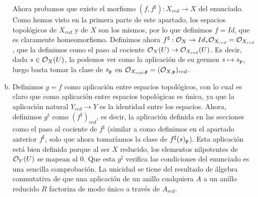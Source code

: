 \documentclass[twoside]{article}
\begin{document}
\begin{solucion}
\begin{enumerate}[(a)]
Ahora probamos que existe el morfismo $(f,f^{\sharp}):X_{red}\to X$ del enunciado. Como hemos visto en la primera parte de este apartado, los espacios topológicos de $X_{red}$ y de $X$ son los mismos, por lo que definimos $f=Id$, que es claramente homeomorfismo. Definimos ahora $f^{\sharp}:{\mathcal O}_{X}\to Id_*{\mathcal O}_{X_{red}}={\mathcal O}_{X_{red}}$, que la definimos como el paso al cociente ${\mathcal O}_{X}(U)\to{\mathcal O}_{X_{red}}(U)$. Es decir, dada $s\in {\mathcal O}_X(U)$, la podemos ver como la aplicación de su germen $s\mapsto s_{\mathfrak{p}}$, luego basta tomar la clase de $s_{\mathfrak{p}}$ en ${\mathcal O}_{X_{red}, \mathfrak{p}}=({\mathcal O}_{X,\mathfrak{p}})_{red}$.

\item Definimos $g=f$ como aplicación entre espacios topológicos, con lo cual es claro que como aplicación entre espacios topológicas es única, ya que la aplicación natural $Y_{red}\to Y$ es la identidad entre los espacios. Ahora, definimos $g^{\sharp}$ como $(f^{\sharp})_{red}$, es decir, la aplicación definida en las secciones como el paso al cociente de $f^{\sharp}$ (similar a como definimos en el apartado anterior $f^{\sharp}$, solo que ahora tomaríamos la clase de $f^{\sharp}(s)_{\mathfrak{p}}$). Esta aplicación está bien definida porque al ser $X$ reducido, los elementos nilpotentes de ${\mathcal O}_Y(U)$ se mapean al 0. Que esta $g^{\sharp}$ verifica las condiciones del enunciado es una sencilla comprobación. La unicidad se tiene del resultado de álgebra conmutativa de que una aplicación de un anillo cualquiera $A$ a un anillo reducido $R$ factoriza de modo único a través de $A_{red}$. 
\end{enumerate}
\end{solucion}

\newpage
\end{document}
